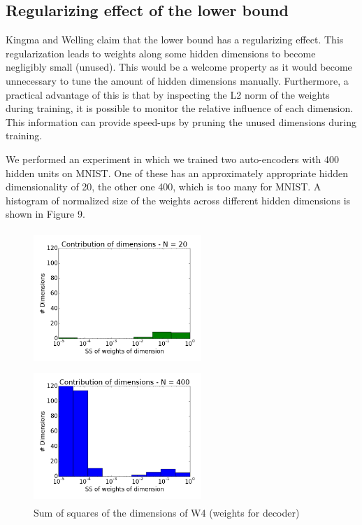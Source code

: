 \documentclass{article}
\begin{document}
\subsection{Regularizing effect of the lower bound}
Kingma and Welling \cite{kingma2013auto} claim that the lower bound has a regularizing effect. This regularization leads to weights along some hidden dimensions to become negligibly small (unused). This would be a welcome property as it would become unnecessary to tune the amount of hidden dimensions manually. Furthermore, a practical advantage of this is that by inspecting the L2 norm of the weights during training, it is possible to monitor the relative influence of each dimension. This information can provide speed-ups by pruning the unused dimensions during training.

We performed an experiment in which we trained two auto-encoders with 400 hidden units on MNIST. One of these has an approximately appropriate hidden dimensionality of 20, the other one 400, which is too many for MNIST. A histogram of normalized size of the weights across different hidden dimensions is shown in Figure 9.

\begin{figure}[htb]
    \centering
    \begin{minipage}{0.36\textwidth}
        \includegraphics[height=2in,width=2.5in]{relevant_z_N20.png}
    \end{minipage}
    \centering
    \begin{minipage}{0.36\textwidth}
        \includegraphics[height=2in,width=2.5in]{relevant_z_N400.png}
    \end{minipage}
    \caption{Sum of squares of the dimensions of W4 (weights for decoder)}
\end{figure}
\end{document}
